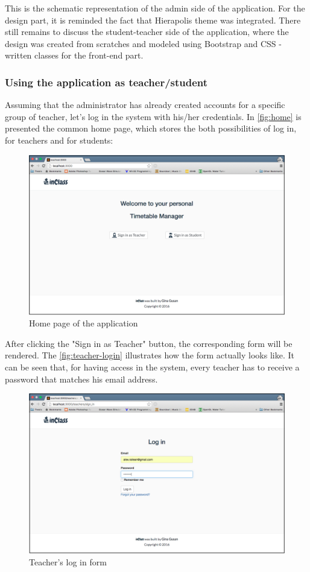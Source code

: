 This is the schematic representation of the admin side of the application. For the design part, it is reminded the fact that Hierapolis theme was integrated. There still remains to discuss the student-teacher side of the application, where the design was created from scratches and modeled using Bootstrap and CSS - written classes for the front-end part. 

\subsubsection{Using the application as teacher/student}
Assuming that the administrator has already created accounts for a specific group of teacher, let's log in the system with his/her credentials. In \autoref{fig:home} is presented the common home page, which stores the both possibilities of log in, for teachers and for students:

\begin{figure}[H]
\centering
\includegraphics[width=14cm]{Chapter3/home.png}
\caption{Home page of the application}
\label{fig:home}
\end{figure}

After clicking the "Sign in as Teacher" button, the corresponding form will be rendered. The \autoref{fig:teacher-login} illustrates how the form actually looks like. It can be seen that, for having access in the system, every teacher has to receive a password that matches his email address. 

\begin{figure}[H]
\centering
\includegraphics[width=14cm]{Chapter3/teacher-login.png}
\caption{Teacher's log in form}
\label{fig:teacher-login}
\end{figure} 

